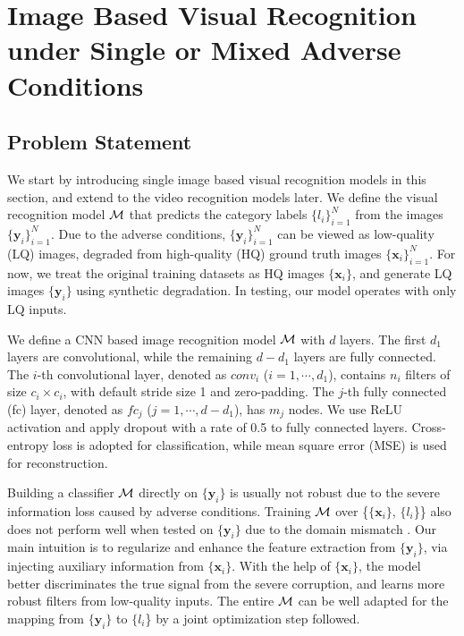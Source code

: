\documentclass[10pt,twocolumn,twoside]{IEEEtran} %
\begin{document}
\section{Image Based Visual Recognition under Single or Mixed Adverse Conditions}\label{sec:image}\subsection{Problem Statement}

We start by introducing single image based visual recognition models in this section, and extend to the video recognition models later. 
We define the visual recognition model ${\mathcal{M}}$ that predicts the category labels $\{l_i\}_{i=1}^N$ from the images $\{\mathbf{y}_i\}_{i=1}^N$. Due to the adverse conditions, $\{\mathbf{y}_i\}_{i=1}^N$ can be viewed as low-quality (LQ) images, degraded from high-quality (HQ) ground truth images $\{\mathbf{x}_i\}_{i=1}^N$. For now, we treat the original training datasets as HQ images $\{\mathbf{x}_i\}$, and generate LQ images $\{\mathbf{y}_i\}$ using synthetic degradation. In testing, our model operates with only LQ inputs.

We define a CNN based image recognition model ${\mathcal{M}}$ with $d$ layers. The first $d_1$ layers are convolutional, while the remaining $d - d_1$ layers are fully connected. The $i$-th convolutional layer, denoted as $conv_i$ ($i = 1, \cdots, d_1$), contains $n_i$ filters of size $c_i \times c_i$, with default stride size 1 and zero-padding. The $j$-th fully connected (fc) layer, denoted as $fc_j$ ($j =  1, \cdots, d - d_1$), has $m_j$ nodes. We use ReLU activation and apply dropout with a rate of 0.5 to fully connected layers. Cross-entropy loss is adopted for classification, while mean square error (MSE) is used for reconstruction. 


Building a classifier ${\mathcal{M}}$ directly on $\{\mathbf{y}_i\}$ is usually not robust due to the severe information loss  caused by adverse conditions. Training ${\mathcal{M}}$ over \{$\{\mathbf{x}_i\}$, $\{l_i$\}\} also does not perform well when tested on $\{\mathbf{y}_i\}$ due to the domain mismatch \cite{vlrr, VFR}. Our main intuition is to regularize and enhance the feature extraction from $\{\mathbf{y}_i\}$, via injecting auxiliary information from $\{\mathbf{x}_i\}$. With the help of $\{\mathbf{x}_i\}$, the model better discriminates the true signal from the severe corruption, and learns more robust filters from low-quality inputs. The entire ${\mathcal{M}}$ can be well adapted for the mapping from $\{\mathbf{y}_i\}$ to $\{l_i$\} by a joint optimization step followed.
\end{document}
